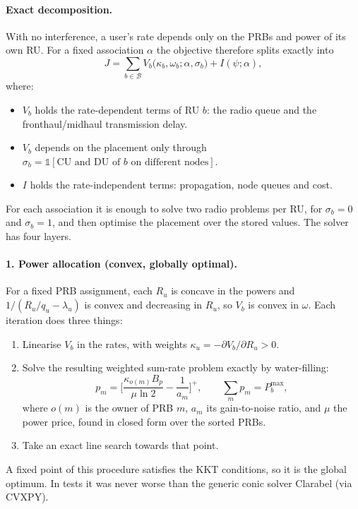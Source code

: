 \documentclass[11pt,oneside]{report}
\newcommand{\cB}{\mathcal{B}}
\begin{document}
\paragraph{Exact decomposition.}
With no interference, a user's rate depends only on the PRBs and power of its own RU.
For a fixed association $\alpha$ the objective therefore splits exactly into
\begin{equation}\label{eq:decomp}
	J=\sum_{b\in\cB}V_b\big(\kappa_b,\omega_b;\alpha,\sigma_b\big)+I(\psi;\alpha),
\end{equation}
where:
\begin{itemize}
	\item $V_b$ holds the rate-dependent terms of RU $b$: the radio queue and the fronthaul/midhaul transmission delay.
	\item $V_b$ depends on the placement only through $\sigma_b=\mathbb{1}[\text{CU and DU of } b \text{ on different nodes}]$.
	\item $I$ holds the rate-independent terms: propagation, node queues and cost.
\end{itemize}
For each association it is enough to solve two radio problems per RU, for $\sigma_b=0$ and $\sigma_b=1$, and then optimise the placement over the stored values.
The solver has four layers.

\paragraph{1. Power allocation (convex, globally optimal).}
For a fixed PRB assignment, each $R_u$ is concave in the powers and $1/(R_u/q_u-\lambda_u)$ is convex and decreasing in $R_u$, so $V_b$ is convex in $\omega$.
Each iteration does three things:
\begin{enumerate}
	\item Linearise $V_b$ in the rates, with weights $\kappa_u=-\partial V_b/\partial R_u>0$.
	\item Solve the resulting weighted sum-rate problem exactly by water-filling:
	\begin{equation}\label{eq:wf}
		p_m=\Big[\frac{\kappa_{o(m)}B_p}{\mu\ln2}-\frac{1}{a_m}\Big]^+,\qquad \sum_mp_m=P_b^{\max},
	\end{equation}
	where $o(m)$ is the owner of PRB $m$, $a_m$ its gain-to-noise ratio, and $\mu$ the power price, found in closed form over the sorted PRBs.
	\item Take an exact line search towards that point.
\end{enumerate}
A fixed point of this procedure satisfies the KKT conditions, so it is the global optimum. In tests it was never worse than the generic conic solver Clarabel (via CVXPY).
\end{document}
